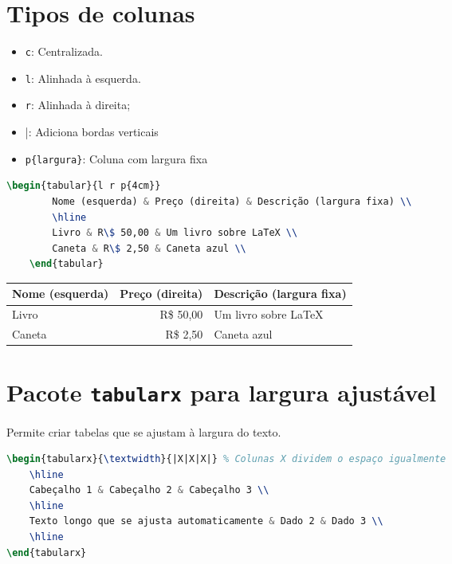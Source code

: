 \section{Tipos de colunas}

\begin{itemize}
    \item \verb|c|: Centralizada.
    \item \verb|l|: Alinhada à esquerda.
    \item \verb|r|: Alinhada à direita;
    \item \verb|||: Adiciona bordas verticais
    \item \verb|p{largura}|: Coluna com largura fixa
\end{itemize}

\begin{lstlisting}[language=tex, caption=Exemplo com alinhamento]
    \begin{tabular}{l r p{4cm}}
        Nome (esquerda) & Preço (direita) & Descrição (largura fixa) \\ 
        \hline
        Livro & R\$ 50,00 & Um livro sobre LaTeX \\ 
        Caneta & R\$ 2,50 & Caneta azul \\ 
    \end{tabular}
\end{lstlisting}

\begin{tabular}{l r p{4cm}}
    Nome (esquerda) & Preço (direita) & Descrição (largura fixa) \\ 
    \hline
    Livro & R\$ 50,00 & Um livro sobre LaTeX \\ 
    Caneta & R\$ 2,50 & Caneta azul \\ 
\end{tabular}

\section{Pacote \texttt{tabularx} para largura ajustável}

Permite criar tabelas que se ajustam à largura do texto.

\begin{lstlisting}[language=tex, caption=Uso do pacote \texttt{tabularx}]
\begin{tabularx}{\textwidth}{|X|X|X|} % Colunas X dividem o espaço igualmente
    \hline
    Cabeçalho 1 & Cabeçalho 2 & Cabeçalho 3 \\ 
    \hline
    Texto longo que se ajusta automaticamente & Dado 2 & Dado 3 \\ 
    \hline
\end{tabularx}
\end{lstlisting}

